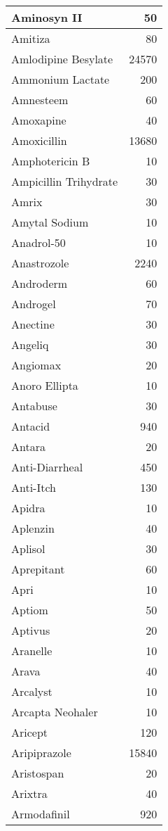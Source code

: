 \documentclass[
]{article}
\begin{document}
\begin{table}
\begin{tabular}[t]{l|r}
\hline
Aminosyn II & 50\\
\hline
Amitiza & 80\\
\hline
Amlodipine Besylate & 24570\\
\hline
Ammonium Lactate & 200\\
\hline
Amnesteem & 60\\
\hline
Amoxapine & 40\\
\hline
Amoxicillin & 13680\\
\hline
Amphotericin B & 10\\
\hline
Ampicillin Trihydrate & 30\\
\hline
Amrix & 30\\
\hline
Amytal Sodium & 10\\
\hline
Anadrol-50 & 10\\
\hline
Anastrozole & 2240\\
\hline
Androderm & 60\\
\hline
Androgel & 70\\
\hline
Anectine & 30\\
\hline
Angeliq & 30\\
\hline
Angiomax & 20\\
\hline
Anoro Ellipta & 10\\
\hline
Antabuse & 30\\
\hline
Antacid & 940\\
\hline
Antara & 20\\
\hline
Anti-Diarrheal & 450\\
\hline
Anti-Itch & 130\\
\hline
Apidra & 10\\
\hline
Aplenzin & 40\\
\hline
Aplisol & 30\\
\hline
Aprepitant & 60\\
\hline
Apri & 10\\
\hline
Aptiom & 50\\
\hline
Aptivus & 20\\
\hline
Aranelle & 10\\
\hline
Arava & 40\\
\hline
Arcalyst & 10\\
\hline
Arcapta Neohaler & 10\\
\hline
Aricept & 120\\
\hline
Aripiprazole & 15840\\
\hline
Aristospan & 20\\
\hline
Arixtra & 40\\
\hline
Armodafinil & 920\\

\end{tabular}
\end{table}
\end{document}
